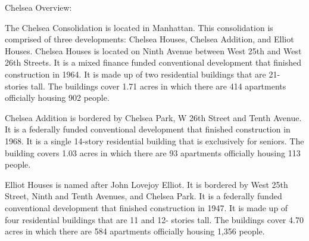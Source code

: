 Chelsea Overview:     

   

The Chelsea Consolidation is located in Manhattan. This consolidation is comprised of three developments: Chelsea Houses, Chelsea Addition, and Elliot Houses. Chelsea Houses is located on Ninth Avenue between West 25th and West 26th Streets. It is a mixed finance funded conventional development that finished construction in 1964. It is made up of two residential buildings that are 21- stories tall. The buildings cover 1.71 acres in which there are 414 apartments officially housing 902 people. 



Chelsea Addition is bordered by Chelsea Park, W 26th Street and Tenth Avenue. It is a federally funded conventional development that finished construction in 1968. It is a single 14-story residential building that is exclusively for seniors. The building covers 1.03 acres in which there are 93 apartments officially housing 113 people. 



Elliot Houses is named after John Lovejoy Elliot. It is bordered by West 25th Street, Ninth and Tenth Avenues, and Chelsea Park. It is a federally funded conventional development that finished construction in 1947. It is made up of four residential buildings that are 11 and 12- stories tall. The buildings cover 4.70 acres in which there are 584 apartments officially housing 1,356 people.